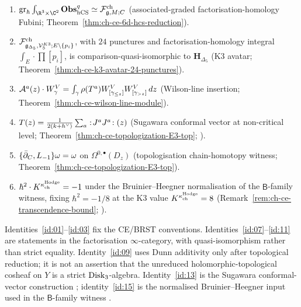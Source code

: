 \begin{enumerate}[label=\textup{(I\arabic*)},ref=I\arabic*]
Theorem~\ref{thm:ch-ce-disk3-algebra}; \cite[Thm.\,4.4.1]{CG17}).
\item\label{id:10}
$\operatorname{gr}_\hbar\int_{\R^3\times\C^2}\Fobs^q_{\hCS}
\simeq\cF^{\mathrm{ch}}_{\fg,M;C}$
(associated-graded factorisation-homology Fubini;
Theorem~\ref{thm:ch-ce-6d-hcs-reduction}).
\item\label{id:11}
$\mathcal{F}^{\mathrm{ch}}_{\mathfrak{g}_{\Delta_5},\mathcal{V}^{K3}_5; E\setminus\{p_i\}}$,
with $24$ punctures and factorisation-homology integral
$\int_E\cdot\prod[p_i]$, is comparison-quasi-isomorphic to
$\mathbf H_{\Delta_5}$
(K3 avatar; Theorem~\ref{thm:ch-ce-k3-avatar-24-punctures}).
\item\label{id:12}
$\mathcal{A}^a(z)\cdot W^V_\gamma = \int_\gamma\rho(T^a)W^V_{[\gamma_{\le z}]}
W^V_{[\gamma_{>z}]}\,dz$
(Wilson-line insertion; Theorem~\ref{thm:ch-ce-wilson-line-module}).
\item\label{id:13}
$T(z) = \tfrac{1}{2(k+h^\vee)}\sum_a:\!J^aJ^a\!:(z)$
(Sugawara conformal vector at non-critical level;
Theorem~\ref{thm:ch-ce-topologization-E3-top};
\cite[Prop.\,5.1]{FrenkelBenZvi2004}).
\item\label{id:14}
$\{\bar\partial_C, L_{-1}\}\omega = \omega$ on $\Omega^{0,\bullet}(D_z)$
(topologisation chain-homotopy witness;
Theorem~\ref{thm:ch-ce-topologization-E3-top}).
\item\label{id:15}
$\hbar^2\cdot K^{\kappa_{\mathrm{ch}}^{\mathrm{Hodge}}} = -1$ under the
Bruinier--Heegner normalisation of the $\mathsf{B}$-family witness,
fixing $\hbar^2 = -1/8$ at the K3 value $K^{\kappa_{\mathrm{ch}}^{\mathrm{Hodge}}} = 8$
(Remark~\ref{rem:ch-ce-transcendence-bound};
\cite{Bruinier2002}).
\end{enumerate}

\begin{remark}
\label{rem:ch-ce-identity-proof-sources}
%
Identities~\eqref{id:01}--\eqref{id:03} fix the CE/BRST
conventions. Identities~\eqref{id:07}--\eqref{id:11} are statements in
the factorisation $\infty$-category, with quasi-isomorphism rather than
strict equality. Identity~\eqref{id:09} uses Dunn additivity only after
topological reduction; it is not an assertion that the unreduced
holomorphic-topological cosheaf on $Y$ is a strict $\mathrm{Disk}_3$-algebra.
Identity~\eqref{id:13} is the Sugawara conformal-vector construction
\cite[Prop.\,5.1]{FrenkelBenZvi2004}; identity~\eqref{id:15} is the
normalised Bruinier--Heegner input used in the \(\mathsf{B}\)-family
witness \cite{Bruinier2002}.
\end{remark}

